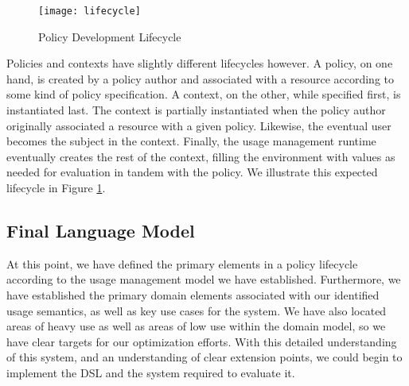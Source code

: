 \begin{figure}[!t]
\centering
\texttt{[image: lifecycle]}
\caption{Policy Development Lifecycle}
\label{fig:model:lifecycle}
\end{figure}

Policies and contexts have slightly different lifecycles however.  A policy, on one hand, is created by a policy author and associated with a resource according to some kind of policy specification.  A context, on the other, while specified first, is instantiated last.  The context is partially instantiated when the policy author originally associated a resource with a given policy.  Likewise, the eventual user becomes the subject in the context.  Finally, the usage management runtime eventually creates the rest of the context, filling the environment with values as needed for evaluation in tandem with the policy.  We illustrate this expected lifecycle in Figure \ref{fig:model:lifecycle}.

\subsection{Final Language Model}


At this point, we have defined the primary elements in a policy lifecycle according to the usage management model we have established.  Furthermore, we have established the primary domain elements associated with our identified usage semantics, as well as key use cases for the system.  We have also located areas of heavy use as well as areas of low use within the domain model, so we have clear targets for our optimization efforts.  With this detailed understanding of this system, and an understanding of clear extension points, we could begin to implement the DSL and the system required to evaluate it.